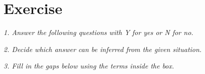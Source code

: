 \documentclass{article}
\begin{document}
\newpage
\section{Exercise}

\noindent \textit{1. Answer the following questions with Y for yes or N for no.}

%
%
%
%
%
%
%
%
%
%
%
%
%
%
%
%
%
%
%
%

\noindent \textit{2. Decide which answer can be inferred from the given situation.}

%
%
%
%
%
%
%
%
%
%
%
%
%
%
%
%
%
%
%
%

\noindent \textit{3. Fill in the gaps below using the terms inside the box.}

%
%
%
%
%
%
%
%
%
%
%
%
%
%
%
%
%
%
%
%
\end{document}
